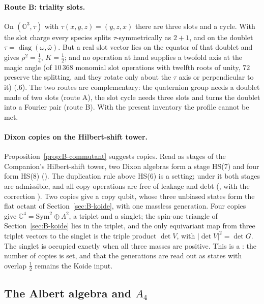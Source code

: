 \paragraph{Route B: triality slots.}
On $(\mathbb O^3,\tau)$ with $\tau(x,y,z)=(y,z,x)$ there are three slots and a cycle. With the slot charge every species
splits $\tau$-symmetrically as $2+1$, and on the doublet $\tau=\operatorname{diag}(\omega,\bar\omega)$. But a real slot vector
lies on the equator of that doublet and gives $\rho^2=\tfrac14$, $K=\tfrac12$; and no operation at hand supplies a twofold
axis at the magic angle (of $10\,368$ monomial slot operations with twelfth roots of unity, $72$ preserve the splitting, and
they rotate only about the $\tau$ axis or perpendicular to it) (.6). The two routes are complementary: the
quaternion group needs a doublet made of two slots (route A), the slot cycle needs three slots and turns the doublet into a
Fourier pair (route B). With the present inventory the profile cannot be met.

\paragraph{Dixon copies on the Hilbert-shift tower.}
Proposition~\ref{prop:B-commutant} suggests copies. Read as stages of the Companion's Hilbert-shift tower, two Dixon
algebras form a stage HS(7) and four form HS(8) (). The duplication rule above HS(6) is a setting; under it both
stages are admissible, and all copy operations are free of leakage and debt (, with the correction ).
Two copies give a copy qubit, whose three unbiased states form the flat octant of Section~\ref{sec:B-koide}, with one
massless generation. Four copies give $\mathbb C^4=\mathrm{Sym}^2\oplus\Lambda^2$, a triplet and a singlet; the spin-one
triangle of Section~\ref{sec:B-koide} lies in the triplet, and the only equivariant map from three triplet vectors to the
singlet is the triple product $\det V$, with $|\det V|^2=\det G$. The singlet is occupied exactly when all three masses are
positive. This is a \Reading: the number of copies is set, and that the generations are read out as states with overlap
$\tfrac12$ remains the Koide input.



\subsection{The Albert algebra and \texorpdfstring{$A_4$}{A4}}
\label{sec:B-albert}

